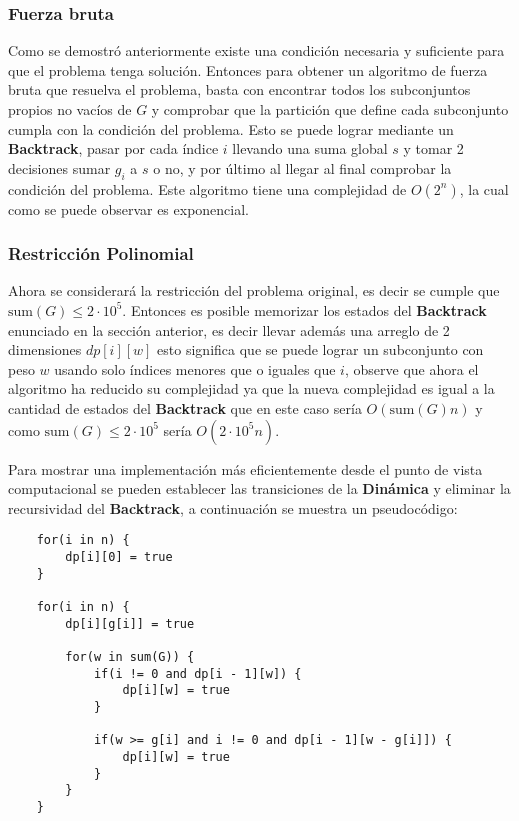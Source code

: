 \documentclass{article}
\begin{document}
\subsubsection{Fuerza bruta}

Como se demostró anteriormente existe una condición necesaria y suficiente para que el problema tenga solución. Entonces para obtener
un algoritmo de fuerza bruta que resuelva el problema, basta con encontrar todos los subconjuntos propios no vacíos de $G$ y comprobar que
la partición que define cada subconjunto cumpla con la condición del problema. Esto se puede lograr mediante un \textbf{Backtrack}, pasar por
cada índice $i$ llevando una suma global $s$ y tomar 2 decisiones sumar $g_i$ a $s$ o no, y por último al llegar al final comprobar la condición
del problema. Este algoritmo tiene una complejidad de $O(2^n)$, la cual como se puede observar es exponencial.

\subsubsection{Restricción Polinomial}

Ahora se considerará la restricción del problema original, es decir se cumple que $\text{sum}(G) \leq 2\cdot 10^5$. Entonces es posible
memorizar los estados del \textbf{Backtrack} enunciado en la sección anterior, es decir llevar además una arreglo de 2 dimensiones $dp[i][w]$ esto
significa que se puede lograr un subconjunto con peso $w$ usando solo índices menores que o iguales que $i$, observe que ahora el algoritmo ha reducido su complejidad ya que la nueva complejidad
es igual a la cantidad de estados del \textbf{Backtrack} que en este caso sería $O(\text{sum}(G)n)$ y como $\text{sum}(G) \leq 2\cdot 10^5$ sería
$O(2\cdot 10^5n)$.

Para mostrar una implementación más eficientemente desde el punto de vista computacional se pueden establecer las transiciones de la \textbf{Dinámica}
y eliminar la recursividad del \textbf{Backtrack}, a continuación se muestra un pseudocódigo:

\begin{verbatim}
    for(i in n) {
        dp[i][0] = true
    }

    for(i in n) { 
        dp[i][g[i]] = true

        for(w in sum(G)) {
            if(i != 0 and dp[i - 1][w]) {
                dp[i][w] = true
            }
    
            if(w >= g[i] and i != 0 and dp[i - 1][w - g[i]]) {
                dp[i][w] = true
            }
        }
    }
\end{verbatim}
\end{document}
